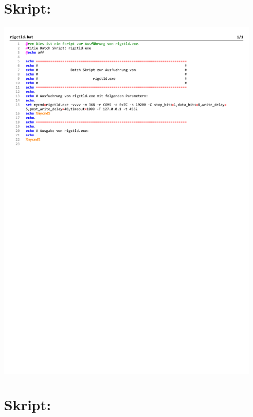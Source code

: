 
\chapter{Skript: }
\label{chap:rigctldbat}

\begin{center}
	\includegraphics[width=1\textwidth]{./appendicies/rigctld}
\end{center}


\chapter{Skript: }
\label{chap:rigctlbat}

